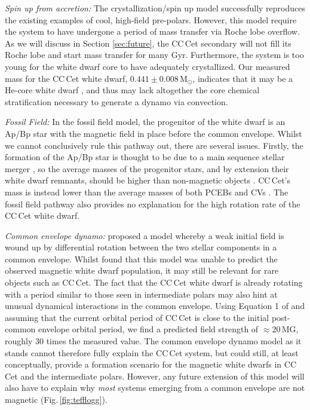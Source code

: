 \documentclass[fleqn,usenatbib]{mnras}
\newcommand{\Msun}{\mbox{$\mathrm{M}_{\odot}$}}
\begin{document}
\textit{Spin up from accretion:} The crystallization/spin up model \citep{iserneral17-1, schreiberetal21-1} successfully reproduces the existing examples of cool, high-field pre-polars. However, this model require the system to have undergone a period of mass transfer via Roche lobe overflow. As we will discuss in Section \ref{sec:future}, the CC\,Cet secondary will not fill its Roche lobe and start mass transfer for many Gyr. Furthermore, the system is too young for the white dwarf core to have adequately crystallized. Our measured mass for the CC\,Cet white dwarf, $0.441\pm0.008$\,\Msun, indicates that it may be a He-core white dwarf \citep{driebeetal98-1, althausetal13-1}, and thus may lack altogether the core chemical stratification necessary to generate a dynamo via convection. 


\textit{Fossil Field:} In the fossil field model, the progenitor of the white dwarf is an Ap/Bp star with the magnetic field in place before the common envelope. Whilst we cannot conclusively rule this pathway out, there are several issues. Firstly, the formation of the Ap/Bp star is thought to be due to a main sequence stellar merger \citep{braithwaite+spruit04-1}, so the average masses of the progenitor stars, and by extension their white dwarf remnants, should be higher than non-magnetic objects \citep{ferrarioetal20-1}. CC\,Cet's mass is instead lower than the average masses of both PCEBs and CVs \citep{zorotovicetal11-1}. The fossil field pathway also provides no explanation for the high rotation rate of the CC\,Cet white dwarf.

\textit{Common envelope dynamo:} \citet{briggsetal18-1} proposed a model whereby a weak initial field is wound up by differential rotation between the two stellar components in a common envelope. Whilst \citet{bellonietal20-1} found that this model was unable to predict the observed magnetic white dwarf population, it may still be relevant for rare objects such as CC\,Cet. The fact that the CC\,Cet white dwarf is already rotating with a period similar to those seen in intermediate polars may also hint at unusual dynamical interactions in the common envelope. Using Equation 1 of \citet{briggsetal18-1} and assuming that the current orbital period of CC\,Cet is close to the initial post-common envelope orbital period, we find a predicted field strength of $\approx20 $\,MG, roughly 30 times the measured value. The common envelope dynamo model as it stands cannot therefore fully explain the CC\,Cet system, but could still, at least conceptually, provide a formation scenario for the magnetic white dwarfs in CC\,Cet and the intermediate polars. However, any future extension of this model will also have to explain why \textit{most} systems emerging from a common envelope are not magnetic (Fig.\,\ref{fig:tefflogg}).
\end{document}
